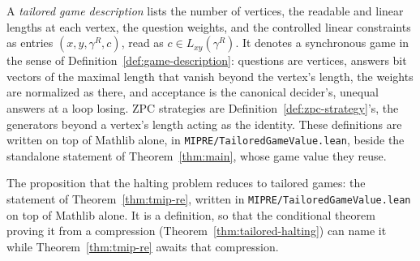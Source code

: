 \begin{definition}
\label{def:tailored-game-data}
\leanok
A \emph{tailored game description} lists the number of vertices, the readable and linear
lengths at each vertex, the question weights, and the controlled linear constraints as
entries $(x, y, \gamma^R, c)$, read as $c \in L_{xy}(\gamma^R)$. It denotes a synchronous game
in the sense of Definition~\ref{def:game-description}: questions are vertices, answers bit
vectors of the maximal length that vanish beyond the vertex's length, the weights are
normalized as there, and acceptance is the canonical decider's, unequal answers at a loop
losing. ZPC strategies are Definition~\ref{def:zpc-strategy}'s, the generators beyond a
vertex's length acting as the identity. These definitions are written on top of Mathlib alone,
in \texttt{MIPRE/TailoredGameValue.lean}, beside the standalone statement of
Theorem~\ref{thm:main}, whose game value they reuse.
\end{definition}

\begin{definition}
\label{def:tailored-halting-reduction}
\leanok
The proposition that the halting problem reduces to tailored games: the statement of
Theorem~\ref{thm:tmip-re}, written in \texttt{MIPRE/TailoredGameValue.lean} on top of Mathlib
alone. It is a definition, so that the conditional theorem proving it from a compression
(Theorem~\ref{thm:tailored-halting}) can name it while Theorem~\ref{thm:tmip-re} awaits that
compression.
\end{definition}

